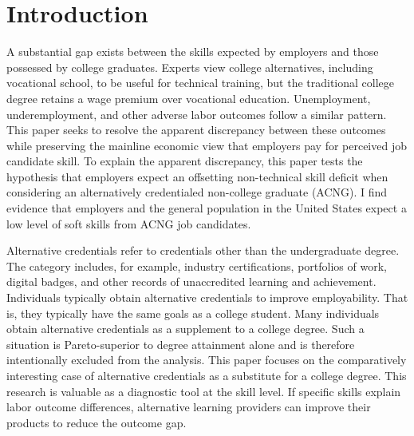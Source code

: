 \documentclass[review]{elsarticle}
\begin{document}
\pagebreak
\linenumbers

\section{Introduction}



A substantial gap exists between the skills expected by employers and those possessed by college graduates\cite{mcgarry2016examination, malik2017great, abbasi2018analysis, gingras2000there}.
Experts view college alternatives,
including vocational school,
to be useful for technical training,
but the traditional college degree retains a wage premium over vocational education.
Unemployment, underemployment, and other adverse labor outcomes follow a similar pattern\cite{smith_2011}.
This paper seeks to resolve the apparent discrepancy between these outcomes while preserving the mainline economic view that employers pay for perceived job candidate skill.
To explain the apparent discrepancy,
this paper tests the hypothesis that employers expect an offsetting non-technical skill deficit when considering an alternatively credentialed non-college graduate (ACNG).
I find evidence that employers and the general population in the United States expect a low level of soft skills from ACNG job candidates.

Alternative credentials refer to credentials other than the undergraduate degree\cite{brown2017complex}.
The category includes, for example,
industry certifications,
portfolios of work,
digital badges, and other records of unaccredited learning and achievement.
Individuals typically obtain alternative credentials to improve employability.
That is, they typically have the same goals as a college student.
Many individuals obtain alternative credentials as a supplement to a college degree.
Such a situation is Pareto-superior to degree attainment alone and is therefore intentionally excluded from the analysis.
This paper focuses on the comparatively interesting case of alternative credentials as a substitute for a college degree.
This research is valuable as a diagnostic tool at the skill level.
If specific skills explain labor outcome differences, alternative learning providers can improve their products to reduce the outcome gap.
\end{document}

